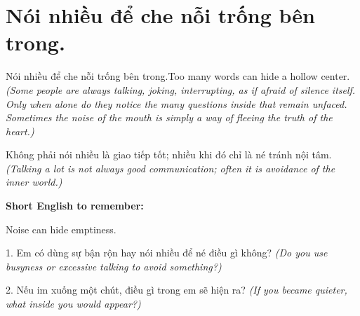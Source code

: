 \section{Nói nhiều để che nỗi trống bên trong.}
\begin{truyen}{Nói nhiều để che nỗi trống bên trong.}{Too many words can hide a hollow center.}
\textit{(Some people are always talking, joking, interrupting, as if afraid of silence itself. Only when alone do they notice the many questions inside that remain unfaced. Sometimes the noise of the mouth is simply a way of fleeing the truth of the heart.)}
\end{truyen}
\begin{baihoc}
Không phải nói nhiều là giao tiếp tốt; nhiều khi đó chỉ là né tránh nội tâm.
\textit{(Talking a lot is not always good communication; often it is avoidance of the inner world.)}
\end{baihoc}
\begin{ghinhoanh}
\textbf{Short English to remember:}

Noise can hide emptiness.
\end{ghinhoanh}
\begin{tuhocnhanh}
1. Em có dùng sự bận rộn hay nói nhiều để né điều gì không? \textit{(Do you use busyness or excessive talking to avoid something?)}

2. Nếu im xuống một chút, điều gì trong em sẽ hiện ra? \textit{(If you became quieter, what inside you would appear?)}
\end{tuhocnhanh}
\ngancach

